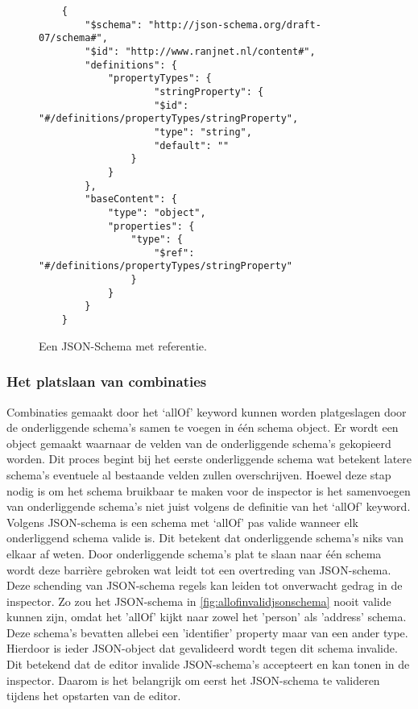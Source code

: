 \begin{figure}[htb]
    \centering
    \lstset{language=JSON}
    \begin{lstlisting}
    {
        "$schema": "http://json-schema.org/draft-07/schema#",
        "$id": "http://www.ranjnet.nl/content#",
        "definitions": {
            "propertyTypes": {
                    "stringProperty": {
                    "$id": "#/definitions/propertyTypes/stringProperty",
                    "type": "string",
                    "default": ""
                }
            }
        },
        "baseContent": {
            "type": "object",
            "properties": {
                "type": {
                    "$ref": "#/definitions/propertyTypes/stringProperty"
                }
            }
        }
    }          
    \end{lstlisting}
    \caption{Een JSON-Schema met referentie.}
    \label{fig:jsonschemrefexample}
\end{figure}


\subsubsection{Het platslaan van combinaties}
Combinaties gemaakt door het ‘allOf’ keyword kunnen worden platgeslagen door de onderliggende schema’s samen te voegen in één schema object. Er wordt een object gemaakt waarnaar de velden van de onderliggende schema’s gekopieerd worden. Dit proces begint bij het eerste onderliggende schema wat betekent latere schema’s eventuele al bestaande velden zullen overschrijven.
Hoewel deze stap nodig is om het schema bruikbaar te maken voor de inspector is het samenvoegen van onderliggende schema’s niet juist volgens de definitie van het ‘allOf’ keyword. Volgens JSON-schema is een schema met ‘allOf’ pas valide wanneer elk onderliggend schema valide is\cite{FoundationsJSONSchema}. Dit betekent dat onderliggende schema’s niks van elkaar af weten. Door onderliggende schema’s plat te slaan naar één schema wordt deze barrière gebroken wat leidt tot een overtreding van JSON-schema. Deze schending van JSON-schema regels kan leiden tot onverwacht gedrag in de inspector. Zo zou het JSON-schema in \autoref{fig:allofinvalidjsonschema} nooit valide kunnen zijn, omdat het 'allOf' kijkt naar zowel het 'person' als 'address' schema. Deze schema's bevatten allebei een 'identifier' property maar van een ander type. Hierdoor is ieder JSON-object dat gevalideerd wordt tegen dit schema invalide. Dit betekend dat de editor invalide JSON-schema's accepteert en kan tonen in de inspector. Daarom is het belangrijk om eerst het JSON-schema te valideren tijdens het opstarten van de editor.

